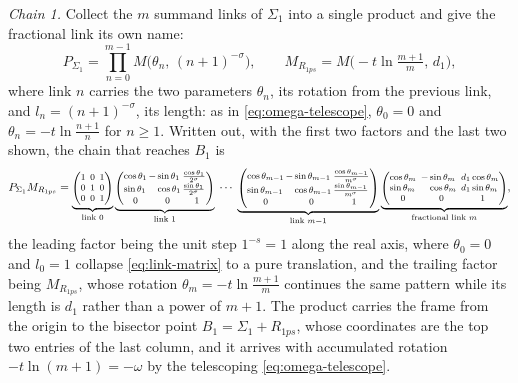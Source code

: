 \documentclass[11pt]{article}
\makeatletter
\theoremstyle{definition}
\newcommand{\linkmatd}[2]{%
\left(\begin{array}{@{}l@{\,}l@{\,}l@{}}
\cos #1 & -\sin #1           & \frac{\cos #1}{#2}\\[1pt]
\sin #1 & \phantom{-}\cos #1 & \frac{\sin #1}{#2}\\[1pt]
\multicolumn{1}{@{}c@{\,}}{0} & \multicolumn{1}{c@{\,}}{0} & \multicolumn{1}{c@{}}{1}
\end{array}\right)}
\newcommand{\linkmat}[2]{%
\left(\begin{array}{@{}l@{\ \,}l@{\ \,}l@{}}
\cos #1 & -\sin #1           & #2\cos #1\\
\sin #1 & \phantom{-}\cos #1 & #2\sin #1\\
\multicolumn{1}{@{}c@{\ \,}}{0} & \multicolumn{1}{c@{\ \,}}{0} & \multicolumn{1}{c@{}}{1}
\end{array}\right)}
\makeatother
\begin{document}
\emph{Chain 1.} Collect the $m$ summand links of $\Sigma_1$ into a single
product and give the fractional link its own name:
\begin{equation}\label{eq:P1-TR1-defs}
P_{\Sigma_1}=\prod_{n=0}^{m-1}M\bigl(\theta_n,\,(n+1)^{-\sigma}\bigr),
\qquad
M_{R_{1ps}}=M\bigl(-t\ln\tfrac{m+1}{m},\,d_1\bigr),
\end{equation}
where link $n$ carries the two parameters
$\theta_n$, its rotation from the previous link, and
$l_n=(n+1)^{-\sigma}$, its length: as in \eqref{eq:omega-telescope},
$\theta_0=0$ and $\theta_n=-t\ln\tfrac{n+1}{n}$ for $n\ge1$. Written out, with
the first two factors and the last two shown, the chain that
reaches $B_1$ is
\begin{equation}\label{eq:P1-written}
\footnotesize
P_{\Sigma_1}M_{R_{1ps}}=
\underbrace{\left(\begin{array}{@{}c@{\ \,}c@{\ \,}c@{}}
1 & 0 & 1\\
0 & 1 & 0\\
0 & 0 & 1
\end{array}\right)}_{\text{link }0}
\underbrace{\linkmatd{\theta_1}{2^{\sigma}}}_{\text{link }1}\;\cdots\;
\underbrace{\linkmatd{\theta_{m-1}}{m^{\sigma}}}_{\text{link }m-1}
\underbrace{\linkmat{\theta_m}{d_1}}_{\text{fractional link }m},
\end{equation}
the leading factor being the unit step $1^{-s}=1$ along the real axis, where
$\theta_0=0$ and $l_0=1$ collapse \eqref{eq:link-matrix} to a pure translation,
and the trailing factor being $M_{R_{1ps}}$, whose rotation
$\theta_m=-t\ln\tfrac{m+1}{m}$ continues the same pattern while its length is
$d_1$ rather than a power of $m+1$. The product carries the frame from the origin
to the bisector point $B_1=\Sigma_1+R_{1ps}$, whose coordinates are the top two
entries of the last column, and it arrives with accumulated rotation
$-t\ln(m+1)=-\omega$ by the telescoping \eqref{eq:omega-telescope}.
\end{document}

